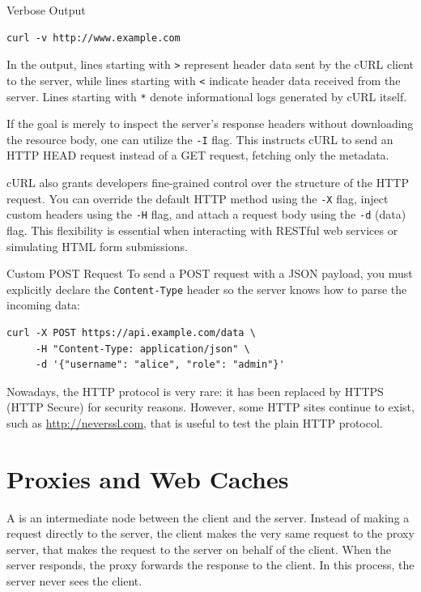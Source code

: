 \begin{example}{Verbose Output}
\begin{verbatim}
curl -v http://www.example.com
\end{verbatim}
In the output, lines starting with \texttt{>} represent header data sent by the cURL client to the server, while lines starting with \texttt{<} indicate header data received from the server. Lines starting with \texttt{*} denote informational logs generated by cURL itself.
\end{example}

If the goal is merely to inspect the server's response headers without downloading the resource body, one can utilize the \texttt{-I} flag. This instructs cURL to send an HTTP HEAD request instead of a GET request, fetching only the metadata.

cURL also grants developers fine-grained control over the structure of the HTTP request. You can override the default HTTP method using the \texttt{-X} flag, inject custom headers using the \texttt{-H} flag, and attach a request body using the \texttt{-d} (data) flag. This flexibility is essential when interacting with RESTful web services or simulating HTML form submissions.

\begin{example}{Custom POST Request}
To send a POST request with a JSON payload, you must explicitly declare the \texttt{Content-Type} header so the server knows how to parse the incoming data:
\begin{verbatim}
curl -X POST https://api.example.com/data \
     -H "Content-Type: application/json" \
     -d '{"username": "alice", "role": "admin"}'
\end{verbatim}
\end{example}

Nowadays, the HTTP protocol is very rare: it has been replaced by HTTPS (HTTP Secure) for security reasons.
However, some HTTP sites continue to exist, such as \url{http://neverssl.com}, that is useful to test the plain HTTP protocol.

\section{Proxies and Web Caches}
A  is an intermediate node between the client and the server. 
Instead of making a request directly to the server, the client makes the very same request to the proxy server, that makes the request to the server on behalf of the client.
When the server responds, the proxy forwards the response to the client.
In this process, the server never sees the client.

